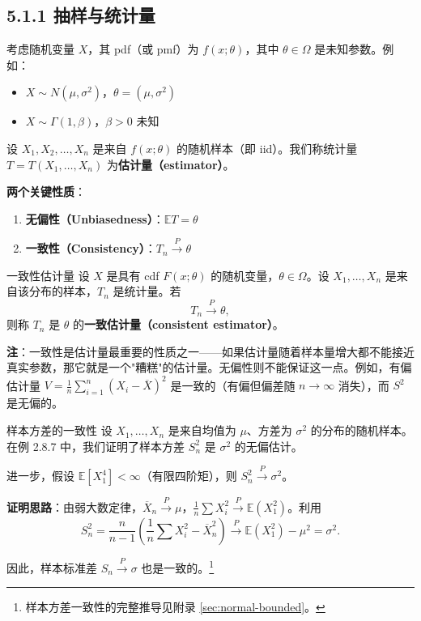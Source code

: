 \subsection{5.1.1 抽样与统计量}

考虑随机变量 $X$，其 pdf（或 pmf）为 $f(x;\theta)$，其中 $\theta \in \Omega$ 是未知参数。例如：

\begin{itemize}
\item $X \sim N(\mu, \sigma^2)$，$\theta = (\mu, \sigma^2)$
\item $X \sim \Gamma(1,\beta)$，$\beta > 0$ 未知
\end{itemize}

设 $X_1, X_2, \ldots, X_n$ 是来自 $f(x;\theta)$ 的随机样本（即 iid）。我们称统计量 $T = T(X_1, \ldots, X_n)$ 为\textbf{估计量（estimator）}。

\textbf{两个关键性质}：
\begin{enumerate}
\item \textbf{无偏性（Unbiasedness）}：$\mathbb{E}T = \theta$
\item \textbf{一致性（Consistency）}：$T_n \xrightarrow{P} \theta$
\end{enumerate}

\begin{definition}{一致性估计量}\label{def:consistency}
设 $X$ 是具有 cdf $F(x;\theta)$ 的随机变量，$\theta \in \Omega$。设 $X_1, \ldots, X_n$ 是来自该分布的样本，$T_n$ 是统计量。若
\[
T_n \xrightarrow{P} \theta,
\]
则称 $T_n$ 是 $\theta$ 的\textbf{一致估计量（consistent estimator）}。
\end{definition}

\textbf{注}：一致性是估计量最重要的性质之一——如果估计量随着样本量增大都不能接近真实参数，那它就是一个"糟糕"的估计量。无偏性则不能保证这一点。例如，有偏估计量 $V = \frac{1}{n}\sum_{i=1}^n (X_i - \overline{X})^2$ 是一致的（有偏但偏差随 $n \to \infty$ 消失），而 $S^2$ 是无偏的。

\begin{example}{样本方差的一致性}\label{ex:sample-variance-consistency}
设 $X_1, \ldots, X_n$ 是来自均值为 $\mu$、方差为 $\sigma^2$ 的分布的随机样本。在例 2.8.7 中，我们证明了样本方差 $S_n^2$ 是 $\sigma^2$ 的无偏估计。

进一步，假设 $\mathbb{E}[X_1^4] < \infty$（有限四阶矩），则 $S_n^2 \xrightarrow{P} \sigma^2$。

\textbf{证明思路}：由弱大数定律，$\overline{X}_n \xrightarrow{P} \mu$，$\frac{1}{n}\sum X_i^2 \xrightarrow{P} \mathbb{E}(X_1^2)$。利用
\[
S_n^2 = \frac{n}{n-1}\left(\frac{1}{n}\sum X_i^2 - \overline{X}_n^2\right) \xrightarrow{P} \mathbb{E}(X_1^2) - \mu^2 = \sigma^2.
\label{eq:sample-variance-consistency}
\]

因此，样本标准差 $S_n \xrightarrow{P} \sigma$ 也是一致的。\footnote{样本方差一致性的完整推导见附录 \cref{sec:normal-bounded}。}
\end{example}

